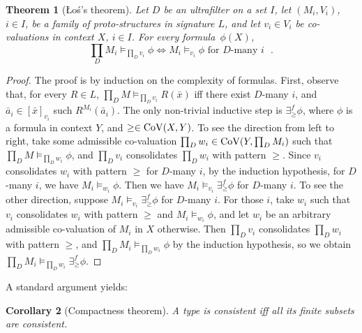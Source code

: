 \documentclass[12pt]{amsart}
\theoremstyle{plain}
\newtheorem{theorem}{Theorem}[section]
\newtheorem{corollary}[theorem]{\bf Corollary}
\newcommand \Val{{\rm{CoV}}}
\newcommand \fr{\scriptscriptstyle{f}}
\begin{document}
	\begin{theorem} [\L{}o\'s's theorem]
		Let $D$ be an ultrafilter on a set $I$,
		let $(M_i, V_i)$, $i \in I$, be a family of proto-structures in signature $L$, and let
		$v_i \in V_i$ be co-valuations in  context $X$, $i \in I$.
		For every formula~$\phi(X)$,
		\[
		\prod_D M_i \models_{\prod_D v_i} \phi
		\iff M_i \models_{v_i} \phi \text{ for $D$-many  $i$ }.
		\]
	\end{theorem}
	\begin{proof}
		The proof is by induction on the complexity of formulas.  First, observe that, for every $R \in L$, $\prod_D M \models_{\prod_D v_i} R(\bar{x})$ iff there exist $D$-many $i$, and $\bar{a}_i \in [\bar{x}]_{v_i}$ such $R^{M_i}(\bar{a}_i)$.
		The only non-trivial inductive step is $\exists^{\fr}_\geq \phi$, where $\phi$ is a formula in context $Y$, and $\geq \in \Val(X,Y)$.
		To see the direction from left to right,
		take some admissible co-valuation $\prod_D w_i \in \Val(Y,\prod_D M_i)$
		such that  $\prod_D M \models_{\prod_D w_i} \phi$,
		and $\prod_D v_i $ consolidates  $\prod_D w_i$ with pattern $\geq$.
		Since $v_i$ consolidates  $w_i$ with pattern $\geq$ for $D$-many  $i$, by the induction hypothesis,
		for $D$-many $i$, we have $M_i \models_{w_i} \phi$.
		Then we have $M_i \models_{v_i} \exists^{\fr}_\geq \phi$ for $D$-many $i$.
		To see the other direction,
		suppose $M_i \models_{v_i} \exists^{\fr}_\geq \phi$ for $D$-many $i$.
		For those $i$, take $w_i$ such that $v_i $ consolidates $w_i$ with pattern $\geq$ and $M_i \models_{w_i}\phi$,
		and let $w_i$ be an arbitrary admissible co-valuation of $M_i$ in $X$ otherwise.
		Then $\prod_D v_i$ consolidates $\prod_D w_i$ with pattern $\geq$, and $\prod_D M_i \models_{\prod_D w_i} \phi$ by the induction hypothesis,
		so we obtain $\prod_D M_i \models_{\prod_D w_i} \exists^{\fr}_\geq \phi$.
	\end{proof}
	
	A standard argument yields:
	\begin{corollary}[Compactness theorem]
		\label{co:Compactness}
		A type is consistent iff all its finite subsets are consistent. 
	\end{corollary}
	
	
	
\end{document}
